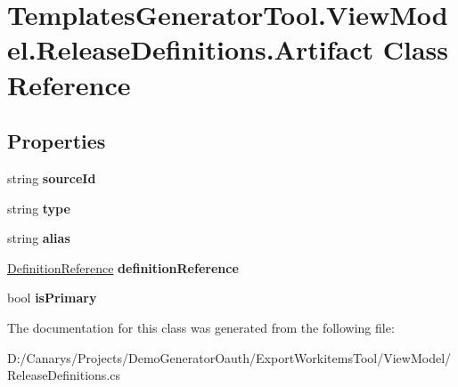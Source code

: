 \hypertarget{class_templates_generator_tool_1_1_view_model_1_1_release_definitions_1_1_artifact}{}\section{Templates\+Generator\+Tool.\+View\+Model.\+Release\+Definitions.\+Artifact Class Reference}
\label{class_templates_generator_tool_1_1_view_model_1_1_release_definitions_1_1_artifact}
\subsection*{Properties}
\begin{DoxyCompactItemize}
\item 
\mbox{\label{class_templates_generator_tool_1_1_view_model_1_1_release_definitions_1_1_artifact_a771adbb66b2c5c228bc65327fa69fab1}} 
string {\bfseries source\+Id}
\item 
\mbox{\label{class_templates_generator_tool_1_1_view_model_1_1_release_definitions_1_1_artifact_ab3de6d8558842e104f4fec1e653376ab}} 
string {\bfseries type}
\item 
\mbox{\label{class_templates_generator_tool_1_1_view_model_1_1_release_definitions_1_1_artifact_a14f189fce5f7114051dc1cad2aa53cd5}} 
string {\bfseries alias}
\item 
\mbox{\label{class_templates_generator_tool_1_1_view_model_1_1_release_definitions_1_1_artifact_a23635e3d5687d273b1f0597785e145d4}} 
\mbox{\hyperlink{class_templates_generator_tool_1_1_view_model_1_1_release_definitions_1_1_definition_reference}{Definition\+Reference}} {\bfseries definition\+Reference}
\item 
\mbox{\label{class_templates_generator_tool_1_1_view_model_1_1_release_definitions_1_1_artifact_afc5f29b7cdf28b4ba63095d4ef236b79}} 
bool {\bfseries is\+Primary}
\end{DoxyCompactItemize}


The documentation for this class was generated from the following file\+:\begin{DoxyCompactItemize}
\item 
D\+:/\+Canarys/\+Projects/\+Demo\+Generator\+Oauth/\+Export\+Workitems\+Tool/\+View\+Model/Release\+Definitions.\+cs\end{DoxyCompactItemize}
